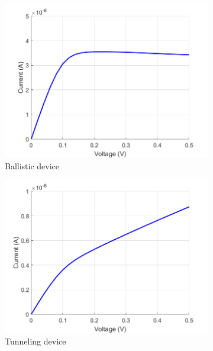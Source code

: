 \documentclass{beamer}
\begin{document}
{\begin{frame}
\begin{figure}
  \begin{subfigure}{0.3\textwidth}
    \includegraphics[width=\linewidth]{IV_ballistic.png}
    \caption{\scriptsize Ballistic device}
  \end{subfigure}
  \begin{subfigure}{0.3\textwidth}
    \includegraphics[width=\linewidth]{IV_tunnel.png}
    \caption{\scriptsize Tunneling device}
  \end{subfigure}
  \begin{subfigure}{0.3\textwidth}

\end{subfigure}
\end{figure}
\end{frame}}
\end{document}

